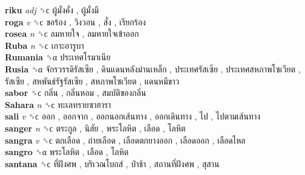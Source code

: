 \textbf{riku} \emph{adj}  ␝ϲ   ผู้มั่งคั่ง ,  ผู้มั่งมี   \\
\textbf{roga} \emph{v}  ␝ϲ   ขอร้อง ,  วิงวอน ,  สั่ง ,  เรียกร้อง   \\
\textbf{rosea} \emph{n}  ␝ϲ   ลมหายใจ ,  ลมหายใจเข้าออก   \\
\textbf{Ruba} \emph{n}  ␝ϲ   เกาะอารูบา   \\
\textbf{Rumania} ␝α   ประเทศโรมาเนีย   \\
\textbf{Rusia} ␝α   จักรวรรดิรัสเซีย ,  ดินแดนหลังม่านเหล็ก ,  ประเทศรัสเซีย ,  ประเทศสหภาพโซเวียต ,  รัสเซีย ,  สหพันธ์รัฐรัสเซีย ,  สหภาพโซเวียต ,  แดนหมีขาว   \\
\textbf{sabor} ␝ϲ   กลิ่น ,  กลิ่นหอม ,  สมบัติของกลิ่น   \\
\textbf{Sahara} \emph{n}  ␝ϲ   ทะเลทรายซาฮารา   \\
\textbf{sali} \emph{v}  ␝ϲ   ออก ,  ออกจาก ,  ออกนอกเส้นทาง ,  ออกเดินทาง ,  ไป ,  ไปตามเส้นทาง   \\
\textbf{sanger} \emph{n}  ␝ϲ   ตระกูล ,  นิสัย ,  พระโลหิต ,  เลือด ,  โลหิต   \\
\textbf{sangra} \emph{v}  ␝ϲ   ตกเลือด ,  ถ่ายเลือด ,  เลือดตกยางออก ,  เลือดออก ,  เลือดไหล   \\
\textbf{sangro} ␝α   พระโลหิต ,  เลือด ,  โลหิต   \\
\textbf{santana} ␝ϲ   ที่ฝังศพ ,  บริเวณโบถส์ ,  ป่าช้า ,  สถานที่ฝังศพ ,  สุสาน   \\

